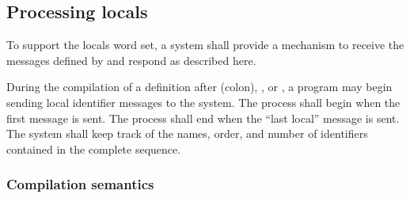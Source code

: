 \subsection{Processing locals} %
\label{local:locals}

To support the locals word set, a system shall provide a mechanism
to receive the messages defined by  and respond as
described here.

During the compilation of a definition after \word[core]{:} (colon),
, or , a program may begin
sending local identifier messages to the system. The process shall
begin when the first message is sent. The process shall end when the
``last local'' message is sent. The system shall keep track of the
names, order, and number of identifiers contained in the complete
sequence.

\subsubsection{Compilation semantics} %

